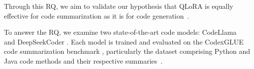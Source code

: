 \begin{itemize}[label=,leftmargin=0.2cm]
	

	
	
	
\end{itemize}

Through this RQ, we aim to validate our hypothesis that QLoRA is equally effective for code summarization as it is for code generation~\cite{weyssow2023exploring}.

To answer the RQ, we examine two state-of-the-art code models: CodeLlama~\cite{codellama} and DeepSeekCoder \cite{deepseek}. Each model is trained and evaluated on the CodexGLUE code summarization benchmark \cite{codexglue}, particularly the dataset comprising Python and Java code methods and their respective summaries~\cite{CodeXGLUEbench}. 

